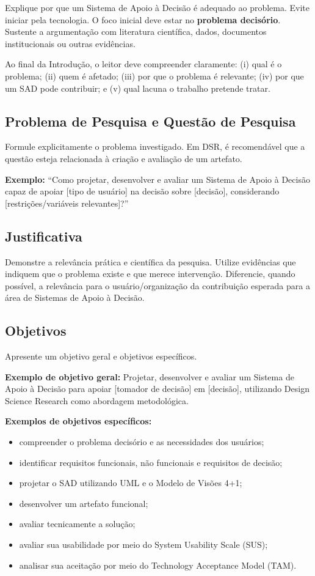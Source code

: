 \documentclass[12pt]{article}
\begin{document}
Explique por que um Sistema de Apoio à Decisão é adequado ao problema. Evite iniciar pela tecnologia. O foco inicial deve estar no \textbf{problema decisório}. Sustente a argumentação com literatura científica, dados, documentos institucionais ou outras evidências.

Ao final da Introdução, o leitor deve compreender claramente:
(i) qual é o problema;
(ii) quem é afetado;
(iii) por que o problema é relevante;
(iv) por que um SAD pode contribuir; e
(v) qual lacuna o trabalho pretende tratar.

\subsection{Problema de Pesquisa e Questão de Pesquisa}

Formule explicitamente o problema investigado. Em DSR, é recomendável que a questão esteja relacionada à criação e avaliação de um artefato.

\textbf{Exemplo:}
``Como projetar, desenvolver e avaliar um Sistema de Apoio à Decisão capaz de apoiar [tipo de usuário] na decisão sobre [decisão], considerando [restrições/variáveis relevantes]?''

\subsection{Justificativa}

Demonstre a relevância prática e científica da pesquisa. Utilize evidências que indiquem que o problema existe e que merece intervenção. Diferencie, quando possível, a relevância para o usuário/organização da contribuição esperada para a área de Sistemas de Apoio à Decisão.

\subsection{Objetivos}

Apresente um objetivo geral e objetivos específicos.

\textbf{Exemplo de objetivo geral:}
Projetar, desenvolver e avaliar um Sistema de Apoio à Decisão para apoiar [tomador de decisão] em [decisão], utilizando Design Science Research como abordagem metodológica.

\textbf{Exemplos de objetivos específicos:}
\begin{itemize}[noitemsep]
    \item compreender o problema decisório e as necessidades dos usuários;
    \item identificar requisitos funcionais, não funcionais e requisitos de decisão;
    \item projetar o SAD utilizando UML e o Modelo de Visões 4+1;
    \item desenvolver um artefato funcional;
    \item avaliar tecnicamente a solução;
    \item avaliar sua usabilidade por meio do System Usability Scale (SUS);
    \item analisar sua aceitação por meio do Technology Acceptance Model (TAM).
\end{itemize}
\end{document}

